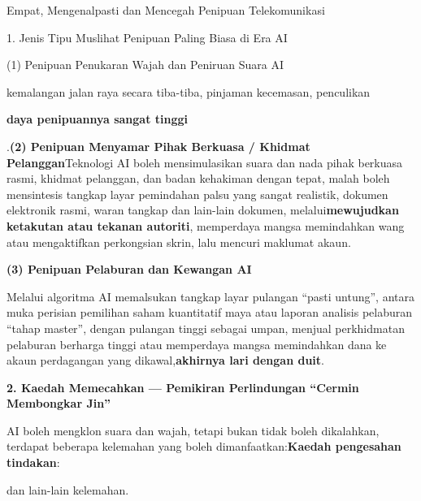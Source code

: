 Empat, Mengenalpasti dan Mencegah Penipuan Telekomunikasi


1. Jenis Tipu Muslihat Penipuan Paling Biasa di Era AI

(1) Penipuan Penukaran Wajah dan Peniruan Suara AI


kemalangan jalan raya secara tiba-tiba, pinjaman kecemasan, penculikan


\textbf{daya penipuannya sangat tinggi}\par

.\textbf{(2) Penipuan Menyamar Pihak Berkuasa / Khidmat Pelanggan}Teknologi AI boleh mensimulasikan suara dan nada pihak berkuasa rasmi, khidmat pelanggan, dan badan kehakiman dengan tepat, malah boleh mensintesis tangkap layar pemindahan palsu yang sangat realistik, dokumen elektronik rasmi, waran tangkap dan lain-lain dokumen, melalui\textbf{mewujudkan ketakutan atau tekanan autoriti}, memperdaya mangsa memindahkan wang atau mengaktifkan perkongsian skrin, lalu mencuri maklumat akaun.

\textbf{(3) Penipuan Pelaburan dan Kewangan AI}\par

Melalui algoritma AI memalsukan tangkap layar pulangan “pasti untung”, antara muka perisian pemilihan saham kuantitatif maya atau laporan analisis pelaburan “tahap master”, dengan pulangan tinggi sebagai umpan, menjual perkhidmatan pelaburan berharga tinggi atau memperdaya mangsa memindahkan dana ke akaun perdagangan yang dikawal,\textbf{akhirnya lari dengan duit}.

\textbf{2. Kaedah Memecahkan — Pemikiran Perlindungan “Cermin Membongkar Jin”}\par

AI boleh mengklon suara dan wajah, tetapi bukan tidak boleh dikalahkan, terdapat beberapa kelemahan yang boleh dimanfaatkan:\textbf{Kaedah pengesahan tindakan}:


dan lain-lain kelemahan.

